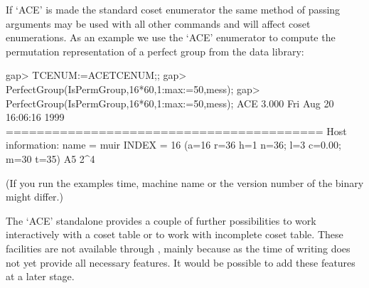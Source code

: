 If `ACE' is made the standard coset enumerator the same method of passing
arguments may be used with all other commands and will affect coset
enumerations. As an example we use the `ACE' enumerator to compute the
permutation representation of a perfect group from the data library:

\begintt
gap> TCENUM:=ACETCENUM;;
gap> PerfectGroup(IsPermGroup,16*60,1:max:=50,mess);
gap> PerfectGroup(IsPermGroup,16*60,1:max:=50,mess);
ACE 3.000        Fri Aug 20 16:06:16 1999
=========================================
Host information:
  name = muir
INDEX = 16 (a=16 r=36 h=1 n=36; l=3 c=0.00; m=30 t=35)
A5 2^4
\endtt

(If you run the examples time, machine name or the version number of the
binary might differ.)


The `ACE' standalone provides a couple of further possibilities to work
interactively with a coset table or to work with incomplete coset table.
These facilities are not available through {\GAP}, mainly because as the
time of writing {\GAP} does not yet provide all necessary features.
It would be possible to add these features at a later stage.
